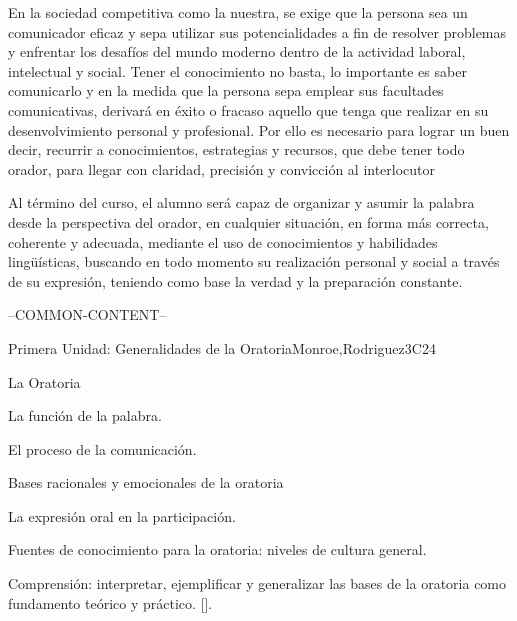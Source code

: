 \begin{syllabus}


\begin{justification}
En la sociedad competitiva como la nuestra,  se exige que la persona sea un comunicador eficaz y  sepa utilizar sus potencialidades a fin de resolver problemas y enfrentar los desafíos del mundo moderno dentro de la actividad laboral, intelectual y social. Tener el conocimiento no basta, lo importante es saber comunicarlo y en la medida que la persona sepa emplear sus facultades comunicativas, derivará en éxito o fracaso aquello que tenga que realizar en su desenvolvimiento personal y profesional. Por ello es necesario para lograr un buen decir, recurrir a conocimientos, estrategias y recursos, que debe tener todo orador, para llegar con claridad, precisión y convicción al interlocutor
\end{justification}

\begin{goals}
\item Al término del curso, el alumno será capaz de organizar y asumir la palabra desde la perspectiva del orador, en cualquier situación, en forma más correcta, coherente  y adecuada, mediante el uso de conocimientos y habilidades lingüísticas, buscando en todo momento su realización personal y social  a través de su expresión, teniendo como base  la verdad y la preparación constante.
\end{goals}

--COMMON-CONTENT--

\begin{unit}{}{Primera Unidad: Generalidades de la Oratoria}{Monroe,Rodriguez}{3}{C24}
\begin{topics}
	\item La Oratoria
	\item La función de la palabra.
	\item El proceso de la comunicación.
	\item Bases racionales y emocionales de la oratoria
		\begin{subtopics}
			\item La expresión oral en la participación.
		\end{subtopics}

	\item Fuentes de conocimiento para la oratoria: niveles de cultura general.
\end{topics}
\begin{learningoutcomes}
	\item Comprensión:  interpretar, ejemplificar y generalizar las bases de la oratoria como fundamento teórico  y  práctico. [\Usage].
\end{learningoutcomes}
\end{unit}


\end{syllabus}
